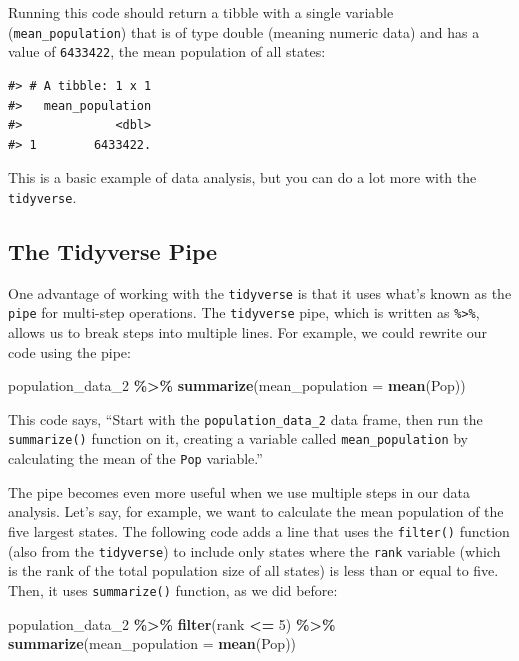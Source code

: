 \documentclass[
]{book}
\newenvironment{Shaded}{\begin{snugshade}}{\end{snugshade}}
\newcommand{\AttributeTok}[1]{\textcolor[rgb]{0.13,0.29,0.53}{#1}}
\newcommand{\DecValTok}[1]{\textcolor[rgb]{0.00,0.00,0.81}{#1}}
\newcommand{\FunctionTok}[1]{\textcolor[rgb]{0.13,0.29,0.53}{\textbf{#1}}}
\newcommand{\NormalTok}[1]{#1}
\newcommand{\SpecialCharTok}[1]{\textcolor[rgb]{0.81,0.36,0.00}{\textbf{#1}}}
\begin{document}
Running this code should return a tibble with a single variable (\texttt{mean\_population}) that is of type double (meaning numeric data) and has a value of \texttt{6433422}, the mean population of all states:

\begin{verbatim}
#> # A tibble: 1 x 1
#>   mean_population
#>             <dbl>
#> 1        6433422.
\end{verbatim}

This is a basic example of data analysis, but you can do a lot more with the \texttt{tidyverse}.

\hypertarget{the-tidyverse-pipe}{%
\subsection{The Tidyverse Pipe}\label{the-tidyverse-pipe}}

One advantage of working with the \texttt{tidyverse} is that it uses what's known as the \texttt{pipe} for multi-step operations. The \texttt{tidyverse} pipe, which is written as \texttt{\%\textgreater{}\%}, allows us to break steps into multiple lines. For example, we could rewrite our code using the pipe:

\begin{Shaded}
\begin{Highlighting}[]
\NormalTok{population\_data\_2 }\SpecialCharTok{\%\textgreater{}\%} 
  \FunctionTok{summarize}\NormalTok{(}\AttributeTok{mean\_population =} \FunctionTok{mean}\NormalTok{(Pop))}
\end{Highlighting}
\end{Shaded}

This code says, ``Start with the \texttt{population\_data\_2} data frame, then run the \texttt{summarize()} function on it, creating a variable called \texttt{mean\_population} by calculating the mean of the \texttt{Pop} variable.''

The pipe becomes even more useful when we use multiple steps in our data analysis. Let's say, for example, we want to calculate the mean population of the five largest states. The following code adds a line that uses the \texttt{filter()} function (also from the \texttt{tidyverse}) to include only states where the \texttt{rank} variable (which is the rank of the total population size of all states) is less than or equal to five. Then, it uses \texttt{summarize()} function, as we did before:

\begin{Shaded}
\begin{Highlighting}[]
\NormalTok{population\_data\_2 }\SpecialCharTok{\%\textgreater{}\%} 
  \FunctionTok{filter}\NormalTok{(rank }\SpecialCharTok{\textless{}=} \DecValTok{5}\NormalTok{) }\SpecialCharTok{\%\textgreater{}\%} 
  \FunctionTok{summarize}\NormalTok{(}\AttributeTok{mean\_population =} \FunctionTok{mean}\NormalTok{(Pop))}
\end{Highlighting}
\end{Shaded}
\end{document}
